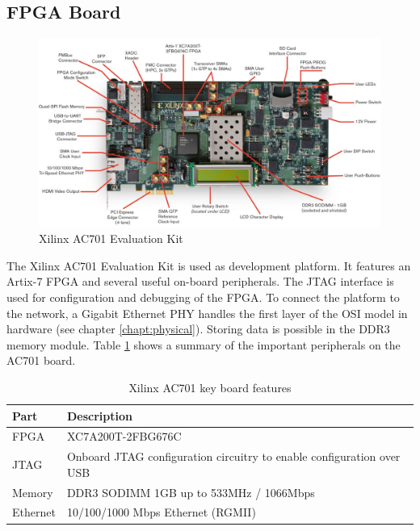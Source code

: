 \subsection{FPGA Board} \label{chapt:fpgaboard}
\begin{figure}[tb!]
    \centering
    \includegraphics[width=\textwidth]{images/mission/ac701.png}
    \caption{Xilinx AC701 Evaluation Kit \cite{image_ac701}}
    \label{fig:ac701}
\end{figure}

The Xilinx AC701 Evaluation Kit is used as development platform. It features an
Artix-7 FPGA and several useful on-board peripherals. The JTAG interface is used
for configuration and debugging of the FPGA. To connect the platform to the
network, a Gigabit Ethernet PHY handles the first layer of the OSI model in
hardware (see chapter \ref{chapt:physical}). Storing data is possible in the DDR3 memory
module. Table \ref{tab:ac701} shows a summary of the important peripherals on
the AC701 board.
\\
\begin{table}[b!]
    \centering
    \begin{tabular}{l l}
        \toprule
        Part & Description \\
        \midrule
        FPGA & XC7A200T-2FBG676C \\
        JTAG & Onboard JTAG configuration circuitry to enable configuration over USB \\
        Memory & DDR3 SODIMM 1GB up to 533MHz / 1066Mbps \\
        Ethernet & 10/100/1000 Mbps Ethernet (RGMII) \\
        \bottomrule
    \end{tabular}
    \caption{Xilinx AC701 key board features \cite{xilinx_ac701}}
    \label{tab:ac701}
\end{table}

